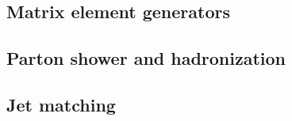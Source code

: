 

\subsection{Matrix element generators}

\subsection{Parton shower and hadronization}

\subsection{Jet matching}